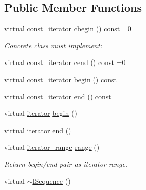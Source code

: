 \subsection*{Public Member Functions}
\begin{DoxyCompactItemize}
\item 
virtual \hyperlink{class_wire_cell_1_1_i_sequence_a70e983c18db65df4337838592fa9fd9d}{const\+\_\+iterator} \hyperlink{class_wire_cell_1_1_i_sequence_a2d9cee960a7ae6081d5f5f1f94bdf7f9}{cbegin} () const =0
\begin{DoxyCompactList}\small\item\em Concrete class must implement\+: \end{DoxyCompactList}\item 
virtual \hyperlink{class_wire_cell_1_1_i_sequence_a70e983c18db65df4337838592fa9fd9d}{const\+\_\+iterator} \hyperlink{class_wire_cell_1_1_i_sequence_a0707bb6db2b2cf79cbf7a6e3c05a7e14}{cend} () const =0
\item 
virtual \hyperlink{class_wire_cell_1_1_i_sequence_a70e983c18db65df4337838592fa9fd9d}{const\+\_\+iterator} \hyperlink{class_wire_cell_1_1_i_sequence_a38e93257d35e23239456ff47ffd6f172}{begin} () const
\item 
virtual \hyperlink{class_wire_cell_1_1_i_sequence_a70e983c18db65df4337838592fa9fd9d}{const\+\_\+iterator} \hyperlink{class_wire_cell_1_1_i_sequence_afc9e30f4829c0b1ac9b8006f6eefd411}{end} () const
\item 
virtual \hyperlink{class_wire_cell_1_1_i_sequence_ac9bcf643972944d21c90743d9281f47a}{iterator} \hyperlink{class_wire_cell_1_1_i_sequence_a03153c2cdc4d34c0feca9b214d4ed2a8}{begin} ()
\item 
virtual \hyperlink{class_wire_cell_1_1_i_sequence_ac9bcf643972944d21c90743d9281f47a}{iterator} \hyperlink{class_wire_cell_1_1_i_sequence_a4aeda2d0a7c1ffd3b1a708c7e983487a}{end} ()
\item 
virtual \hyperlink{class_wire_cell_1_1_i_sequence_ac49f0584f3aaafc13a525953ebafad95}{iterator\+\_\+range} \hyperlink{class_wire_cell_1_1_i_sequence_a5ea837972a6ba68ef563902edd25a8a4}{range} ()
\begin{DoxyCompactList}\small\item\em Return begin/end pair as iterator range. \end{DoxyCompactList}\item 
virtual \hyperlink{class_wire_cell_1_1_i_sequence_a961611c1a2718fd8ac5bfe3120e6e46f}{$\sim$\+I\+Sequence} ()
\end{DoxyCompactItemize}
